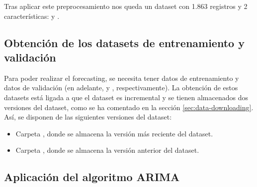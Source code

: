 Tras aplicar este preprocesamiento nos queda un dataset con 1.863 registros y 2 características:  y .




\subsection{Obtención de los datasets de entrenamiento y validación}


Para poder realizar el forecasting, se necesita tener datos de entrenamiento y datos de validación (en adelante,  y , respectivamente). La obtención de estos datasets está ligada a que el dataset \citep{dataset} es incremental y se tienen almacenados dos versiones del dataset, como se ha comentado en la sección \ref{sec:data-downloading}. \\ 

Así, se disponen de las siguientes versiones del dataset:

\begin{itemize}
 \item Carpeta  \citep{master}, donde se almacena la versión más reciente del dataset.
 \item Carpeta  \citep{master}, donde se almacena la versión anterior del dataset.
\end{itemize}












\newpage
\subsection{Aplicación del algoritmo ARIMA}

















